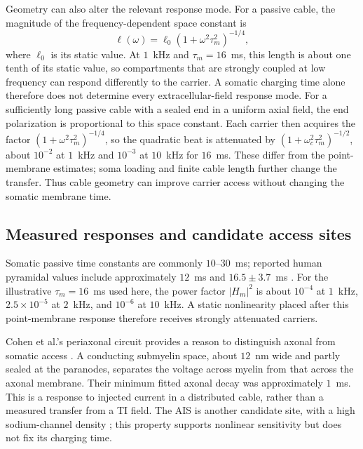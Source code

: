 \documentclass[11pt,a4paper]{article}
\begin{document}
Geometry can also alter the relevant response mode. For a passive cable, the
magnitude of the frequency-dependent space constant is
\begin{equation}
\ell(\omega)=\ell_0(1+\omega^2\tau_m^2)^{-1/4},
\label{eq:lambda}
\end{equation}
where $\ell_0$ is its static value. At $1$~kHz and $\tau_m=16$~ms, this length
is about one tenth of its static value, so compartments that are strongly coupled
at low frequency can respond differently to the carrier. A somatic charging time
alone therefore does not determine every extracellular-field response mode.
For a sufficiently long passive cable with a sealed end in a uniform axial field,
the end polarization is proportional to this space constant. Each carrier then
acquires the factor $(1+\omega^2\tau_m^2)^{-1/4}$, so the quadratic beat is
attenuated by $(1+\omega_c^2\tau_m^2)^{-1/2}$, about $10^{-2}$ at $1$~kHz and
$10^{-3}$ at $10$~kHz for $16$~ms. These differ from the point-membrane estimates;
soma loading and finite cable length further change the transfer.
Thus cable geometry can improve carrier access without changing the somatic
membrane time.

\subsection{Measured responses and candidate access sites}
Somatic passive time constants are commonly $10$--$30$~ms; reported human pyramidal
values include approximately $12$~ms \cite{deitcher2017} and $16.5\pm3.7$~ms
\cite{eyal2016}. For the illustrative $\tau_m=16$~ms used here, the power factor
$|H_m|^2$ is about $10^{-4}$ at $1$~kHz, $2.5\times10^{-5}$ at $2$~kHz, and
$10^{-6}$ at $10$~kHz. A static nonlinearity placed after this point-membrane response
therefore receives strongly attenuated carriers.

Cohen et al.'s periaxonal circuit provides a reason to distinguish axonal from
somatic access \cite{cohen2020periaxonal}. A conducting submyelin space, about
$12$~nm wide and partly sealed at the paranodes, separates the voltage across
myelin from that across the axonal membrane. Their minimum fitted axonal decay
was approximately $1$~ms. This is a response to injected current in a distributed
cable, rather than a measured transfer from a TI field. The AIS is another candidate
site, with a high sodium-channel density \cite{kole2008ais}; this property supports
nonlinear sensitivity but does not fix its charging time.
\end{document}
